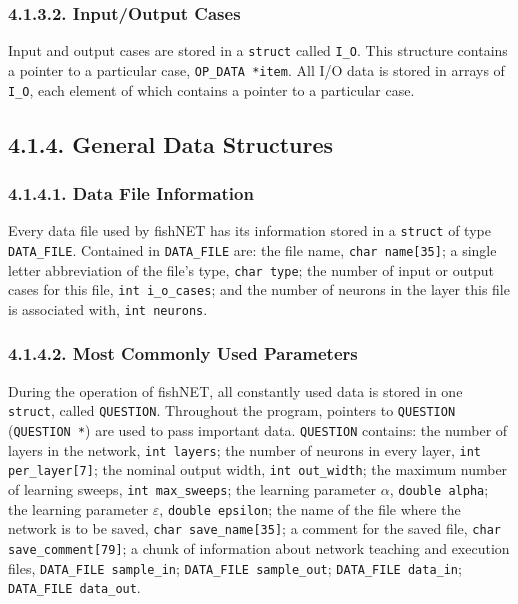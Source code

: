 \documentclass[12pt]{report}
\begin{document}
\subsubsection{4.1.3.2. Input/Output Cases}

Input and output cases are stored in a \texttt{struct} called \texttt{I\_O}.
This structure contains a pointer to a particular case, \texttt{OP\_DATA *item}.
All I/O data is stored in arrays of \texttt{I\_O}, each element of
which contains a pointer to a particular case.

\subsection{4.1.4. General Data Structures}

\subsubsection{4.1.4.1. Data File Information}

Every data file used by fishNET has its information stored in a
\texttt{struct} of type \texttt{DATA\_FILE}.
Contained in \texttt{DATA\_FILE} are: the file name, \texttt{char name[35]};
a single letter abbreviation of the file's type, \texttt{char type};
the number of input or output cases for this file, \texttt{int
i\_o\_cases}; and the number of neurons in the layer this file is
associated with, \texttt{int neurons}.

\subsubsection{4.1.4.2. Most Commonly Used Parameters}

During the operation of fishNET, all constantly used data is stored
in one \texttt{struct}, called \texttt{QUESTION}.
Throughout the program, pointers to \texttt{QUESTION} (\texttt{QUESTION *}) 
are used to pass important data.
\texttt{QUESTION} contains: the number of layers in the network,
\texttt{int layers}; the number of neurons in every layer, \texttt{int
per\_layer[7]}; the nominal output width, \texttt{int out\_width};
the maximum number of learning sweeps, \texttt{int max\_sweeps};
the learning parameter $\alpha$, \texttt{double alpha};
the learning parameter $\varepsilon$, \texttt{double epsilon};
the name of the file where the network is to be saved, \texttt{char
save\_name[35]};
a comment for the saved file, \texttt{char save\_comment[79]};
a chunk of information about network teaching and execution files,
\texttt{DATA\_FILE sample\_in};
\texttt{DATA\_FILE sample\_out};
\texttt{DATA\_FILE data\_in};
\texttt{DATA\_FILE data\_out}.
\end{document}
